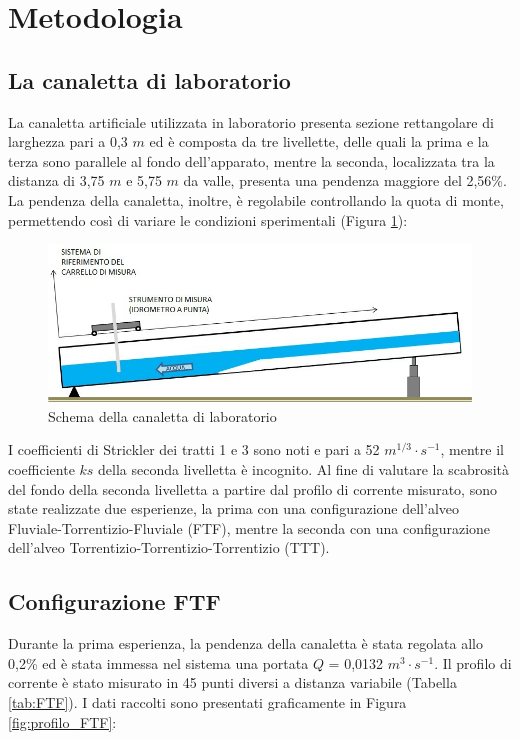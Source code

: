 \documentclass[12pt]{article} %
\begin{document}
\newpage
\section{Metodologia}
\subsection{La canaletta di laboratorio}

\noindent La canaletta artificiale utilizzata in laboratorio presenta sezione rettangolare di larghezza pari a 0,3 $m$ ed è composta da tre livellette, delle quali la prima e la terza sono parallele al fondo dell’apparato, mentre la seconda, localizzata tra la distanza di 3,75 $m$ e 5,75 $m$ da valle, presenta una pendenza maggiore del 2,56\%.
La pendenza della canaletta, inoltre, è regolabile controllando la quota di monte, permettendo così di variare le condizioni sperimentali (Figura \ref{fig:canaletta}):

\begin{figure}[H]
    \centering
    \includegraphics[scale=0.6]{Canaletta.jpg}
    \caption{Schema della canaletta di laboratorio}
    \label{fig:canaletta}
\end{figure}

\noindent I coefficienti di Strickler dei tratti 1 e 3 sono noti e pari a 52 $m^{1/3}\cdot s^{-1}$, mentre il coefficiente $ks$ della seconda livelletta è incognito. Al fine di valutare la scabrosità del fondo della seconda livelletta a partire dal profilo di corrente misurato, sono state realizzate due esperienze, la prima con una configurazione dell’alveo Fluviale-Torrentizio-Fluviale (FTF), mentre la seconda con una configurazione dell'alveo Torrentizio-Torrentizio-Torrentizio (TTT).

\subsection{Configurazione FTF}

\noindent Durante la prima esperienza, la pendenza della canaletta è stata regolata allo 0,2\% ed è stata immessa nel sistema una portata $Q$ = 0,0132 $m^3\cdot s^{-1}$. Il profilo di corrente è stato misurato in 45 punti diversi a distanza variabile (Tabella \ref{tab:FTF}). I dati raccolti sono presentati graficamente in Figura \ref{fig:profilo_FTF}:
\end{document}

